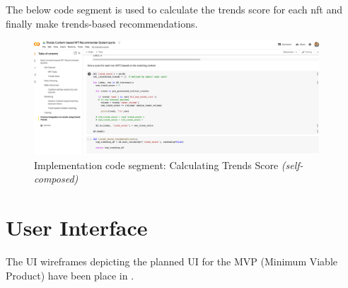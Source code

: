The below code segment is used to calculate the trends score for each \gls{nft} and finally make trends-based recommendations.
\begin{figure}[h!]
\centering
\includegraphics[width=0.95\textwidth]{images/Implementation/code/calculating trends score.png}
\caption{Implementation code segment: Calculating Trends Score \textit{(self-composed)}}
\label{fig:code-trends-score}
\end{figure}


\section{User Interface}

The UI wireframes depicting the planned UI for the MVP (Minimum Viable Product) have been place in \textbf{}.



